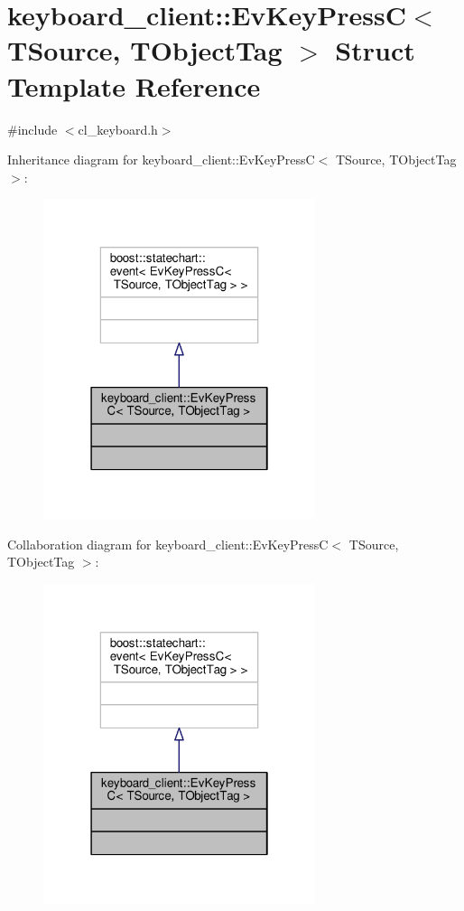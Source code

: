 \hypertarget{structkeyboard__client_1_1EvKeyPressC}{}\section{keyboard\+\_\+client\+:\+:Ev\+Key\+PressC$<$ T\+Source, T\+Object\+Tag $>$ Struct Template Reference}
\label{structkeyboard__client_1_1EvKeyPressC}


{\ttfamily \#include $<$cl\+\_\+keyboard.\+h$>$}



Inheritance diagram for keyboard\+\_\+client\+:\+:Ev\+Key\+PressC$<$ T\+Source, T\+Object\+Tag $>$\+:\nopagebreak
\begin{figure}[H]
\begin{center}
\leavevmode
\includegraphics[width=226pt]{structkeyboard__client_1_1EvKeyPressC__inherit__graph}
\end{center}
\end{figure}


Collaboration diagram for keyboard\+\_\+client\+:\+:Ev\+Key\+PressC$<$ T\+Source, T\+Object\+Tag $>$\+:\nopagebreak
\begin{figure}[H]
\begin{center}
\leavevmode
\includegraphics[width=226pt]{structkeyboard__client_1_1EvKeyPressC__coll__graph}
\end{center}
\end{figure}


